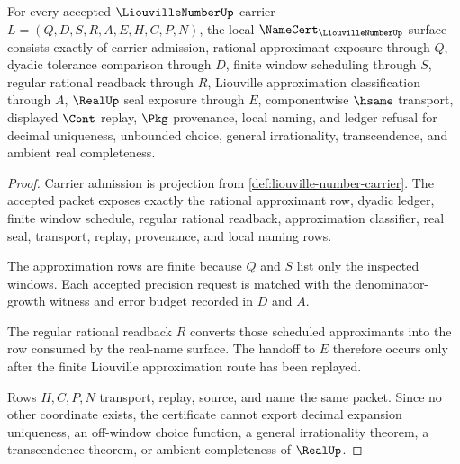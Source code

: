 \begin{theorem}
\label{thm:liouville-number-namecert-obligations}
For every accepted $\LiouvilleNumberUp$ carrier $L=(Q,D,S,R,A,E,H,C,P,N)$, the local $\NameCert_{\LiouvilleNumberUp}$ surface consists exactly of carrier admission, rational-approximant exposure through $Q$, dyadic tolerance comparison through $D$, finite window scheduling through $S$, regular rational readback through $R$, Liouville approximation classification through $A$, $\RealUp$ seal exposure through $E$, componentwise $\hsame$ transport, displayed $\Cont$ replay, $\Pkg$ provenance, local naming, and ledger refusal for decimal uniqueness, unbounded choice, general irrationality, transcendence, and ambient real completeness.
\end{theorem}
\begin{proof}
Carrier admission is projection from \autoref{def:liouville-number-carrier}. The accepted packet exposes exactly the rational approximant row, dyadic ledger, finite window schedule, regular rational readback, approximation classifier, real seal, transport, replay, provenance, and local naming rows.

The approximation rows are finite because $Q$ and $S$ list only the inspected windows. Each accepted precision request is matched with the denominator-growth witness and error budget recorded in $D$ and $A$.

The regular rational readback $R$ converts those scheduled approximants into the row consumed by the real-name surface. The handoff to $E$ therefore occurs only after the finite Liouville approximation route has been replayed.

Rows $H,C,P,N$ transport, replay, source, and name the same packet. Since no other coordinate exists, the certificate cannot export decimal expansion uniqueness, an off-window choice function, a general irrationality theorem, a transcendence theorem, or ambient completeness of $\RealUp$.
\end{proof}

